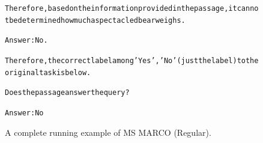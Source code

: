 \begin{figure}[t]
{{\begin{alltt}
Therefore, based on the information provided in the passage, it cannot be determined how much a spectacled bear weighs. 

Answer: No. 

Therefore, the correct label among {'Yes', 'No'} (just the label) to the original task is below. 

Does the passage answer the query? 

Answer: No
\end{alltt}
}}
\caption{A complete running example of MS MARCO (Regular).}
\label{fig:msmarco=regular_example}
\end{figure}
